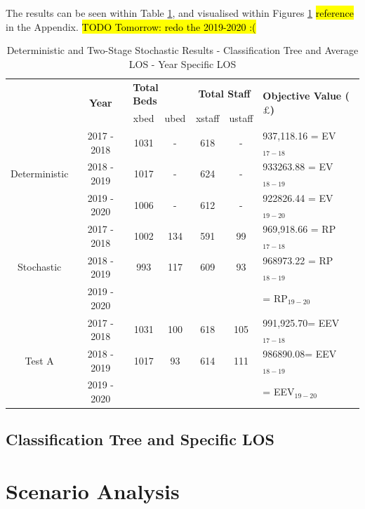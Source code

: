 \documentclass[../thesis.tex]{subfiles}
\begin{document}
The results can be seen within Table \ref{tab:Results8}, and visualised within Figures \ref{} \hl{reference} in the Appendix.
\hl{TODO Tomorrow: redo the 2019-2020 :( }
\begin{table}[h!]
    \centering
    \begin{tabular}{ccccccl}\toprule
 & \multirow{2}{*}{\textbf{Year}}& \multicolumn{2}{l}{\textbf{Total Beds}} & \multicolumn{2}{c}{\textbf{Total Staff}} & \multirow{2}{*}{\textbf{Objective Value ($\pounds$)}}\\ \cmidrule(lr){3-4} \cmidrule(lr){5-6}
&& xbed           & ubed          & xstaff         & ustaff         \\ \midrule
     \multirow{3}{*}{Deterministic} & 2017 - 2018 & 1031  & - & 618  & - & 937,118.16 =  EV$_{17-18}$ \\ 
      & 2018 - 2019 & 1017& - & 624 & - &  933263.88 =  EV$_{18-19}$ \\
      & 2019 - 2020 & 1006  & - & 612 & - &  922826.44 =  EV$_{19-20}$\\ \midrule
     \multirow{3}{*}{Stochastic} & 2017 - 2018 & 1002 & 134 &591  & 99 &  969,918.66 =  RP$_{17-18}$ \\ 
      & 2018 - 2019 &  993 & 117  & 609  &  93& 968973.22 =  RP$_{18-19}$ \\
      & 2019 - 2020 & &  & & &  =  RP$_{19-20}$\\ \midrule    
     \multirow{3}{*}{Test A} & 2017 - 2018 & 1031 & 100 & 618  &105  & 991,925.70=  EEV$_{17-18}$ \\ 
      & 2018 - 2019& 1017 &93 & 614  & 111 & 986890.08=  EEV$_{18-19}$ \\
      & 2019 - 2020 &  &  &  & &  =  EEV$_{19-20}$\\ \bottomrule       
    \end{tabular}
    \caption{Deterministic and Two-Stage Stochastic Results - Classification Tree and Average LOS - Year Specific LOS}
    \label{tab:Results8}
\end{table}














\newpage
\subsection{Classification Tree and Specific LOS}
\section{Scenario Analysis}
\end{document}
